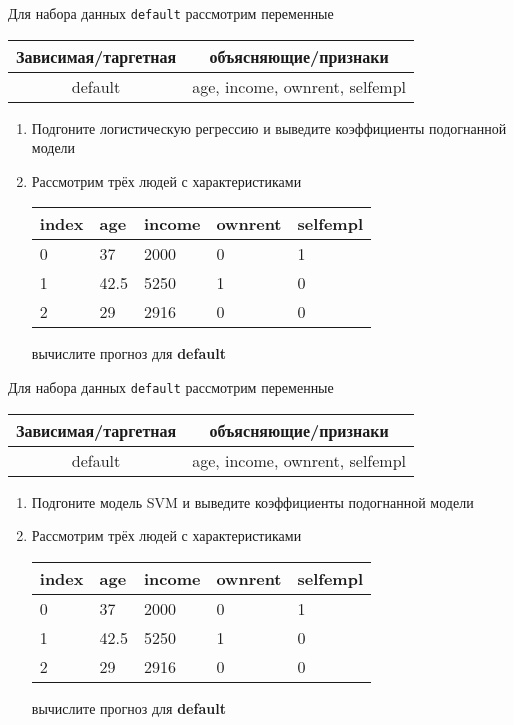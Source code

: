 \begin{exercise}
Для набора данных \texttt{default} рассмотрим переменные

\begin{center}
	\begin{tabular}{|c|c|} \hline
		Зависимая/таргетная & объясняющие/признаки \\ \hline
		default & age, income, ownrent, selfempl \\ \hline
	\end{tabular}
\end{center}

\begin{enumerate}
	\item Подгоните логистическую регрессию и выведите коэффициенты подогнанной модели
	\item Рассмотрим трёх людей с характеристиками
	\begin{center}
		\begin{tabular}{|l||l|l|l|l|}\hline
			index & age & income & ownrent & selfempl  \\ \hline\hline
			0 & 37 & 2000 & 0 & 1  \\
			1 & 42.5 & 5250 & 1 & 0  \\
			2 & 29 & 2916 & 0 & 0  \\ \hline
		\end{tabular}
	\end{center}
	вычислите прогноз для \textbf{default} 
\end{enumerate}
\end{exercise}

\begin{exercise}
Для набора данных \texttt{default} рассмотрим переменные

\begin{center}
	\begin{tabular}{|c|c|} \hline
		Зависимая/таргетная & объясняющие/признаки \\ \hline
		default & age, income, ownrent, selfempl \\ \hline
	\end{tabular}
\end{center}

\begin{enumerate}
	\item Подгоните модель SVM и выведите коэффициенты подогнанной модели
	\item Рассмотрим трёх людей с характеристиками
	\begin{center}
		\begin{tabular}{|l||l|l|l|l|}\hline
			index & age & income & ownrent & selfempl  \\ \hline\hline
			0 & 37 & 2000 & 0 & 1  \\
			1 & 42.5 & 5250 & 1 & 0  \\
			2 & 29 & 2916 & 0 & 0  \\ \hline
		\end{tabular}
	\end{center}
	вычислите прогноз для \textbf{default} 
\end{enumerate}
\end{exercise}
	
